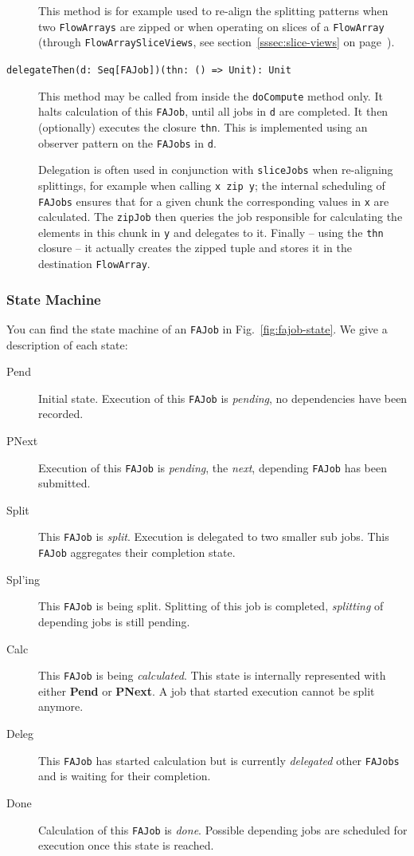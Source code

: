 \documentclass[runningheads,a4paper,fleqn]{llncs}
\begin{document}
\begin{description}
    This method is for example used to re-align the splitting
    patterns when two \texttt{FlowArrays} are zipped or when
    operating on slices of a \texttt{FlowArray} (through
    \texttt{FlowArraySliceViews}, see section~\ref{sssec:slice-views}
    on page~\pageref{sssec:slice-views}).
  \item[\texttt{delegateThen(d: Seq[FAJob])(thn: () => Unit): Unit}]
    This method may be called from inside the \texttt{doCompute}
    method only. It halts calculation of this \texttt{FAJob}, until
    all jobs in \texttt{d} are completed. It then (optionally)
    executes the closure \texttt{thn}. This is implemented using an
    observer pattern on the \texttt{FAJobs} in \texttt{d}.

    Delegation is often used in conjunction with \texttt{sliceJobs}
    when re-aligning splittings, for example when calling \texttt{x
      zip y}; the internal scheduling of \texttt{FAJobs} ensures 
    that for a given chunk the corresponding values in \texttt{x} are
    calculated. The \texttt{zipJob} then queries the job responsible
    for calculating the elements in this chunk in \texttt{y} and
    delegates to it. Finally -- using the \texttt{thn} closure -- it
    actually creates the zipped tuple and stores it in the destination 
    \texttt{FlowArray}.
\end{description}

\subsubsection{State Machine}
You can find the state machine of an \texttt{FAJob} in
Fig.~\ref{fig:fajob-state}. We give a description of each state: 

\begin{description}
\item[Pend] Initial state. Execution of this \texttt{FAJob} is
  \emph{pending}, no dependencies have been recorded.
\item[PNext] Execution of this \texttt{FAJob} is
  \emph{pending}, the \emph{next}, depending \texttt{FAJob} has been
  submitted.
\item[Split] This \texttt{FAJob} is \emph{split}. Execution is
  delegated to two smaller sub jobs. This \texttt{FAJob} aggregates
  their completion state.
\item[Spl'ing] This \texttt{FAJob} is being split. Splitting of this
  job is completed, \emph{splitting} of depending jobs is still
  pending.
\item[Calc] This \texttt{FAJob} is being \emph{calculated}. This state
  is internally represented with either \textbf{Pend} or
  \textbf{PNext}. A job that started execution cannot be split
  anymore.
\item[Deleg] This \texttt{FAJob} has started calculation but is
  currently \emph{delegated} other \texttt{FAJobs} and is waiting for
  their completion.
\item[Done] Calculation of this \texttt{FAJob} is
  \emph{done}. Possible depending jobs are scheduled for execution
  once this state is reached.
\end{description}
\end{document}
